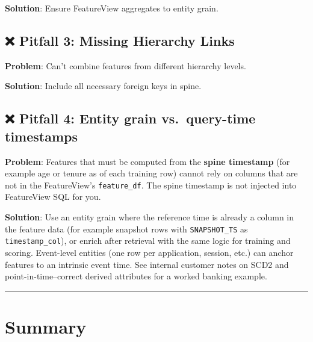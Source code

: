 \documentclass[
  letterpaper,
  DIV=11,
  numbers=noendperiod]{scrreprt}
\begin{document}
\textbf{Solution}: Ensure FeatureView aggregates to entity grain.

\hypertarget{pitfall-3-missing-hierarchy-links}{%
\subsection{❌ Pitfall 3: Missing Hierarchy
Links}\label{pitfall-3-missing-hierarchy-links}}

\textbf{Problem}: Can't combine features from different hierarchy
levels.

\textbf{Solution}: Include all necessary foreign keys in spine.

\hypertarget{pitfall-4-entity-grain-vs.-query-time-timestamps}{%
\subsection{❌ Pitfall 4: Entity grain vs.~query-time
timestamps}\label{pitfall-4-entity-grain-vs.-query-time-timestamps}}

\textbf{Problem}: Features that must be computed from the \textbf{spine
timestamp} (for example age or tenure as of each training row) cannot
rely on columns that are not in the FeatureView's \texttt{feature\_df}.
The spine timestamp is not injected into FeatureView SQL for you.

\textbf{Solution}: Use an entity grain where the reference time is
already a column in the feature data (for example snapshot rows with
\texttt{SNAPSHOT\_TS} as \texttt{timestamp\_col}), or enrich after
retrieval with the same logic for training and scoring. Event-level
entities (one row per application, session, etc.) can anchor features to
an intrinsic event time. See internal customer notes on SCD2 and
point-in-time--correct derived attributes for a worked banking example.

\begin{center}\rule{0.5\linewidth}{0.5pt}\end{center}

\hypertarget{summary-2}{%
\section{Summary}\label{summary-2}}
\end{document}
